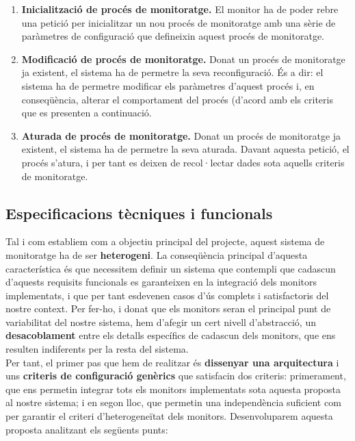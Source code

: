 \begin{enumerate}
\item \textbf{Inicialització de procés de monitoratge.} El monitor ha de poder rebre una petició per inicialitzar un nou procés de monitoratge amb una sèrie de paràmetres de configuració que defineixin aquest procés de monitoratge.
\item \textbf{Modificació de procés de monitoratge.} Donat un procés de monitoratge ja existent, el sistema ha de permetre la seva reconfiguració. És a dir: el sistema ha de permetre modificar els paràmetres d'aquest procés i, en conseqüència, alterar el comportament del procés (d'acord amb els criteris que es presenten a continuació.
\item \textbf{Aturada de procés de monitoratge.} Donat un procés de monitoratge ja existent, el sistema ha de permetre la seva aturada. Davant aquesta petició, el procés s'atura, i per tant es deixen de recol·lectar dades sota aquells criteris de monitoratge.
\end{enumerate}

\subsection{Especificacions tècniques i funcionals}

Tal i com establiem com a objectiu principal del projecte, aquest sistema de monitoratge ha de ser \textbf{heterogeni}. La conseqüència principal d'aquesta característica és que necessitem definir un sistema que contempli que cadascun d'aquests requisits funcionals es garanteixen en la integració dels monitors implementats, i que per tant esdevenen casos d'ús complets i satisfactoris del nostre context. Per fer-ho, i donat que els monitors seran el principal punt de variabilitat del nostre sistema, hem d'afegir un cert nivell d'abstracció, un \textbf{desacoblament} entre els detalls específics de cadascun dels monitors, que ens resulten indiferents per la resta del sistema.\\

Per tant, el primer pas que hem de realitzar és \textbf{dissenyar una arquitectura} i uns \textbf{criteris de configuració genèrics} que satisfacin dos criteris: primerament, que ens permetin integrar tots els monitors implementats sota aquesta proposta al nostre sistema; i en segon lloc, que permetin una independència suficient com per garantir el criteri d'heterogeneïtat dels monitors. Desenvoluparem aquesta proposta analitzant els següents punts:

